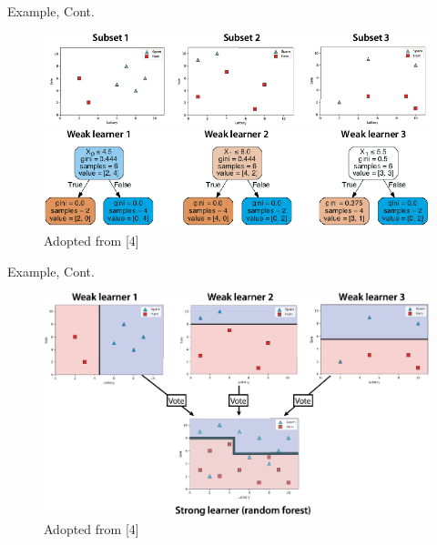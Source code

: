 \documentclass[serif, aspectratio=169]{beamer}
\begin{document}
\begin{frame}{Example, Cont.}
    \begin{center}
    \begin{figure}[!htb]
        \includegraphics[width=\linewidth]{pic/rf_e2.png} \\
        \includegraphics[width=0.85\linewidth]{pic/rf_e3.png} \\
        {\scriptsize Adopted from [4]}
    \end{figure}
    \endminipage
    \end{center}
\end{frame}

\begin{frame}{Example, Cont.}
    \begin{center}
    \begin{figure}[bh]
        \includegraphics[width=\textwidth]{pic/rf_e4.png}
        {\scriptsize Adopted from [4]}
    \end{figure}
    \endminipage
    \end{center}
\end{frame}
\end{document}
